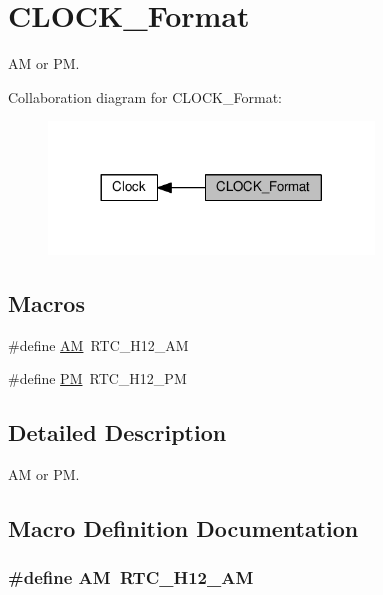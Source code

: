 \hypertarget{group___c_l_o_c_k___format}{}\section{C\+L\+O\+C\+K\+\_\+\+Format}
\label{group___c_l_o_c_k___format}


AM or PM.  


Collaboration diagram for C\+L\+O\+C\+K\+\_\+\+Format\+:\nopagebreak
\begin{figure}[H]
\begin{center}
\leavevmode
\includegraphics[width=245pt]{d0/d53/group___c_l_o_c_k___format}
\end{center}
\end{figure}
\subsection*{Macros}
\begin{DoxyCompactItemize}
\item 
\#define \hyperlink{group___c_l_o_c_k___format_gad301e6a88b1c01108f4867f2ea6f683c}{AM}~R\+T\+C\+\_\+\+H12\+\_\+\+AM
\item 
\#define \hyperlink{group___c_l_o_c_k___format_ga23c7d58108d99a089ce0824823e6b950}{PM}~R\+T\+C\+\_\+\+H12\+\_\+\+PM
\end{DoxyCompactItemize}


\subsection{Detailed Description}
AM or PM. 



\subsection{Macro Definition Documentation}
\subsubsection[{\texorpdfstring{AM}{AM}}]{\setlength{\rightskip}{0pt plus 5cm}\#define AM~R\+T\+C\+\_\+\+H12\+\_\+\+AM}\hypertarget{group___c_l_o_c_k___format_gad301e6a88b1c01108f4867f2ea6f683c}{}\label{group___c_l_o_c_k___format_gad301e6a88b1c01108f4867f2ea6f683c}


